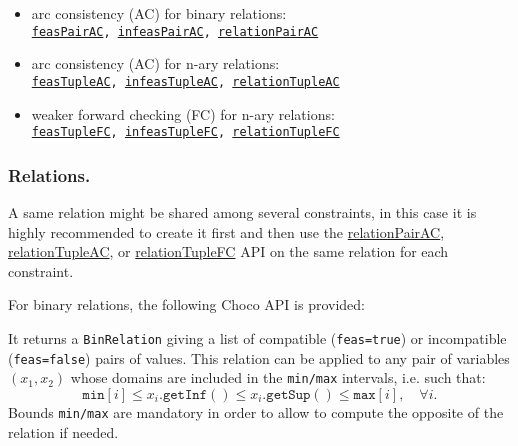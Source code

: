 \begin{notedef}
  \begin{itemize}
  \item arc consistency (AC) for binary relations:\\
{\tt \hyperlink{feaspairac:feaspairacconstraint}{feasPairAC}, \hyperlink{infeaspairac:infeaspairacconstraint}{infeasPairAC}, \hyperlink{relationpairac:relationpairacconstraint}{relationPairAC}}
  \item arc consistency (AC) for n-ary relations:\\
{\tt \hyperlink{feastupleac:feastupleacconstraint}{feasTupleAC}, \hyperlink{infeastupleac:infeastupleacconstraint}{infeasTupleAC}, \hyperlink{relationtupleac:relationtupleacconstraint}{relationTupleAC}}
  \item weaker forward checking (FC) for n-ary relations:\\
{\tt \hyperlink{feastuplefc:feastuplefcconstraint}{feasTupleFC}, \hyperlink{infeastuplefc:infeastuplefcconstraint}{infeasTupleFC}, \hyperlink{relationtuplefc:relationtuplefcconstraint}{relationTupleFC}}
  \end{itemize}
\end{notedef}

\subsubsection{Relations.}
A same relation might be shared among several constraints, in this case it is highly recommended to create it first and then use the \hyperlink{relationpairac:relationpairacconstraint}{relationPairAC}, \hyperlink{relationtupleac:relationtupleacconstraint}{relationTupleAC}, or \hyperlink{relationtuplefc:relationtuplefcconstraint}{relationTupleFC} API  on the same relation for each constraint.

For binary relations, the following Choco API is provided:\\

It returns a \texttt{BinRelation} giving a list of compatible (\texttt{feas=true}) or incompatible (\texttt{feas=false}) pairs of values. This relation can be applied to any pair of variables $(x_1,x_2)$ whose domains are included in the \texttt{min/max} intervals, i.e. such that:
$$\mathtt{min}[i] \le x_i.\mathtt{getInf}() \le x_i.\mathtt{getSup}() \le  \mathtt{max}[i],\quad \forall i.$$
Bounds \texttt{min/max} are mandatory in order to allow to compute the opposite of the relation if needed.

